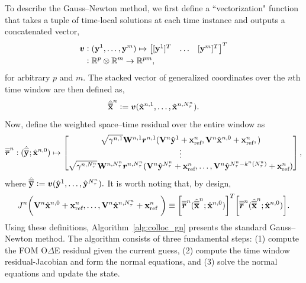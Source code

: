 To describe the Gauss--Newton method, we first define a ``vectorization" function that takes a tuple of time-local solutions at each time instance and outputs 
a concatenated vector, 
\begin{align*}
 \boldsymbol v &\vcentcolon (\mathbf{y}^{1},\ldots,\mathbf{y}^{m} ) \mapsto \begin{bmatrix} [\mathbf{y}^{1}]^T & \ldots & [\mathbf{y}^{m}]^T \end{bmatrix}^T  \\
&\vcentcolon \mathbb{R}^{p} \otimes \mathbb{R}^{m} \rightarrow \mathbb{R}^{pm},
\end{align*}
for arbitrary $p$ and $m$. The stacked vector of generalized coordinates over the $n$th time window are then defined as, 
\begin{equation*}
\hat{\overline{\overline{\mathbf {x}}}}^{n} \vcentcolon= 
\boldsymbol v (\hat{\mathbf{x}}^{n,1},\ldots,\hat{\mathbf{x}}^{n,N_{\tau}^{n}} ).
\end{equation*}
Now, define the weighted space--time residual over the entire window as
\begin{equation*}
\overline{\overline{\boldsymbol r}}^{n}_{\text{}} : (\hat{\overline{\overline{\mathbf{y}}}}^{};\hat{\mathbf{x}}^{n,0}) \mapsto \begin{bmatrix}
 \sqrt{\gamma^{n,1} } \mathbf{W}^{n,1} \boldsymbol r_{}^{n,1}( \mathbf {V}^{n} \hat{\mathbf{y}}^{1} + \mathbf{x}_\text{ref}^{n},  \mathbf {V}^{n} \hat{\mathbf{x}}^{n,0} + \mathbf{x}_\text{ref}^{n},) \\
\vdots \\
 \sqrt{\gamma^{n,N_{\tau}^{n}} } \mathbf{W}^{n,N_{\tau}^{n}} \boldsymbol r_{}^{n,N_{\tau}^{n}}( \mathbf {V}^{n} \hat{\mathbf{y}}^{N_{\tau}^{n}} + \mathbf{x}_\text{ref}^{n}, \ldots,\mathbf {V}^{n} \hat{\mathbf{y}}^{N_{\tau}^{n} - k^n(N_{\tau}^{n}) } + \mathbf{x}_\text{ref}^{n}) \\
\end{bmatrix},
\end{equation*}
where $\hat{\overline{\overline{\mathbf{y}}}}^{} \vcentcolon= \boldsymbol v (\hat{\mathbf{y}}^{1},\ldots,\hat{\mathbf{y}}^{N_{\tau}^{n}} ).$
It is worth noting that, by design,
\begin{equation*}
J_{}^{n} \bigg( \mathbf {V}^{n} \hat{\mathbf{x}}^{n,0} + \mathbf{x}_\text{ref}^{n},\ldots,\mathbf {V}^{n} \hat{\mathbf{x}}^{n,N_{\tau}^{n}} + \mathbf{x}_\text{ref}^{n} \ \bigg) 
\equiv
\bigg[\overline{\overline{\boldsymbol r}}^{n}_{\text{}}  (\hat{\overline{\overline{\mathbf {x}}}}^{n};\hat{\mathbf{x}}^{n,0}) \bigg]^T \bigg[ \overline{\overline{\boldsymbol r}}^{n}_{\text{}}(\hat{\overline{\overline{\mathbf {x}}}}^{n};\hat{\mathbf{x}}^{n,0}) \bigg].
\end{equation*} 
Using these definitions, Algorithm~\ref{alg:colloc_gn} presents the standard Gauss--Newton method. The algorithm consists of three fundamental steps: (1) compute the FOM O$\Delta$E residual given the current guess, (2) compute the time window residual-Jacobian and form the normal equations, and (3) solve the normal equations and update the state. 

